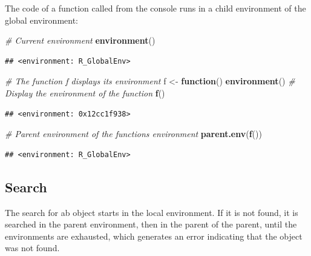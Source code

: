 \documentclass[
  12pt,
  american,
  a4paper,
  extrafontsizes,onecolumn,openright
  ]{memoir}
\newenvironment{Shaded}{\begin{snugshade}}{\end{snugshade}}
\newcommand{\CommentTok}[1]{\textcolor[rgb]{0.56,0.35,0.01}{\textit{#1}}}
\newcommand{\ControlFlowTok}[1]{\textcolor[rgb]{0.13,0.29,0.53}{\textbf{#1}}}
\newcommand{\FunctionTok}[1]{\textcolor[rgb]{0.13,0.29,0.53}{\textbf{#1}}}
\newcommand{\NormalTok}[1]{#1}
\newcommand{\OtherTok}[1]{\textcolor[rgb]{0.56,0.35,0.01}{#1}}
\begin{document}
\normalsize

The code of a function called from the console runs in a child environment of the global environment:

\scriptsize

\begin{Shaded}
\begin{Highlighting}[]
\CommentTok{\# Current environment}
\FunctionTok{environment}\NormalTok{()}
\end{Highlighting}
\end{Shaded}

\begin{verbatim}
## <environment: R_GlobalEnv>
\end{verbatim}

\begin{Shaded}
\begin{Highlighting}[]
\CommentTok{\# The function f displays its environment}
\NormalTok{f }\OtherTok{\textless{}{-}} \ControlFlowTok{function}\NormalTok{() }\FunctionTok{environment}\NormalTok{()}
\CommentTok{\# Display the environment of the function}
\FunctionTok{f}\NormalTok{()}
\end{Highlighting}
\end{Shaded}

\begin{verbatim}
## <environment: 0x12cc1f938>
\end{verbatim}

\begin{Shaded}
\begin{Highlighting}[]
\CommentTok{\# Parent environment of the function\textquotesingle{}s environment}
\FunctionTok{parent.env}\NormalTok{(}\FunctionTok{f}\NormalTok{())}
\end{Highlighting}
\end{Shaded}

\begin{verbatim}
## <environment: R_GlobalEnv>
\end{verbatim}

\normalsize

\subsection{Search}\label{search}

The search for ab object starts in the local environment.
If it is not found, it is searched in the parent environment, then in the parent of the parent, until the environments are exhausted, which generates an error indicating that the object was not found.
\end{document}
